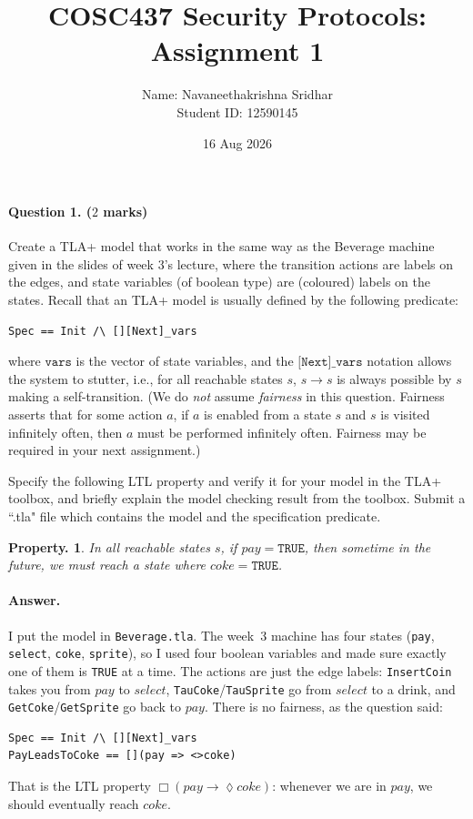 \documentclass{article}
\title{COSC437 Security Protocols: Assignment 1}
\author{Name: Navaneethakrishna Sridhar \\ Student ID: 12590145}
\date{16 Aug 2026}
\renewcommand{\diamond}{\lozenge} %
\newtheorem{property}{Property.}
\begin{document}
\maketitle

\paragraph{Question 1. ($2$ marks)}
Create a TLA+ model that works in the same way as the Beverage machine given in the slides of week $3$'s lecture, where the transition actions are labels on the edges, and state variables (of boolean type) are (coloured) labels on the states. 
Recall that an TLA+ model is usually defined by the following predicate:
\begin{verbatim}
Spec == Init /\ [][Next]_vars    
\end{verbatim}
where $\texttt{vars}$ is the vector of state variables, and the $\texttt{[Next]\_vars}$ notation allows the system to stutter, i.e., for all reachable states $s$, $s\rightarrow s$ is always possible by $s$ making a self-transition. (We do \emph{not} assume \emph{fairness} in this question. Fairness asserts that for some action $a$, if $a$ is enabled from a state $s$ and $s$ is visited infinitely often, then $a$ must be performed infinitely often. Fairness may be required in your next assignment.)

Specify the following LTL property and verify it for your model in the TLA+ toolbox, and briefly explain the model checking result from the toolbox. Submit a ``.tla" file which contains the model and the specification predicate.

\begin{property}
In all reachable states $s$, if $pay = \texttt{TRUE}$, then sometime in the future, we must reach a state where $coke = \texttt{TRUE}$.    
\end{property}

\paragraph{Answer.}
I put the model in \texttt{Beverage.tla}. The week~3 machine has four states (\texttt{pay}, \texttt{select}, \texttt{coke}, \texttt{sprite}), so I used four boolean variables and made sure exactly one of them is \texttt{TRUE} at a time. The actions are just the edge labels: \texttt{InsertCoin} takes you from $pay$ to $select$, \texttt{TauCoke}/\texttt{TauSprite} go from $select$ to a drink, and \texttt{GetCoke}/\texttt{GetSprite} go back to $pay$. There is no fairness, as the question said:
\begin{verbatim}
Spec == Init /\ [][Next]_vars
PayLeadsToCoke == [](pay => <>coke)
\end{verbatim}
That is the LTL property $\Box(pay \rightarrow \diamond coke)$: whenever we are in $pay$, we should eventually reach $coke$.
\end{document}
